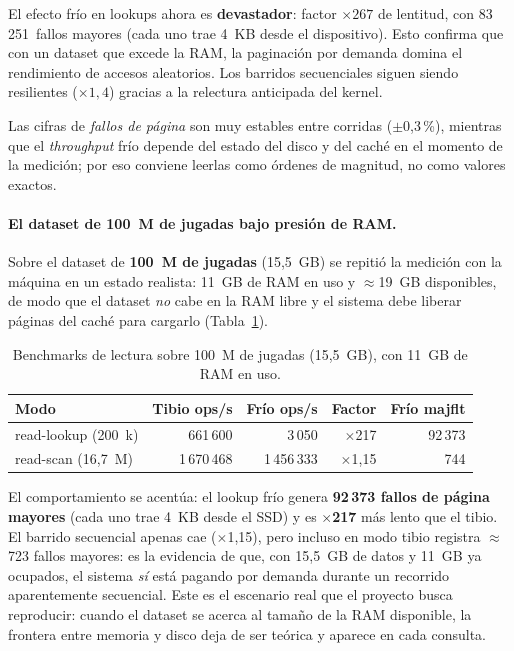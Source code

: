 \documentclass[12pt, letterpaper]{article}
\begin{document}
El efecto frío en lookups ahora es \textbf{devastador}: factor
$\times 267$ de lentitud, con 83\,251~fallos mayores (cada uno trae 4~KB
desde el dispositivo). Esto confirma que con un dataset que excede la RAM,
la paginación por demanda domina el rendimiento de accesos aleatorios. Los
barridos secuenciales siguen siendo resilientes ($\times 1{,}4$) gracias a
la relectura anticipada del kernel.

Las cifras de \emph{fallos de página} son muy estables entre corridas
($\pm$0{,}3\,\%), mientras que el \emph{throughput} frío depende del estado
del disco y del caché en el momento de la medición; por eso conviene leerlas
como órdenes de magnitud, no como valores exactos.

\paragraph{El dataset de 100~M de jugadas bajo presión de RAM.}
Sobre el dataset de \textbf{100~M de jugadas} (15{,}5~GB) se repitió la
medición con la máquina en un estado realista: 11~GB de RAM en uso y
$\approx$19~GB disponibles, de modo que el dataset \emph{no} cabe en la RAM
libre y el sistema debe liberar páginas del caché para cargarlo
(Tabla~\ref{tab:fase5_100m}).

\begin{table}[H]
\centering
\caption{Benchmarks de lectura sobre 100~M de jugadas (15{,}5~GB), con 11~GB de RAM en uso.}
\label{tab:fase5_100m}
\begin{tabular}{@{}l r r r r@{}}
\toprule
\textbf{Modo} & \textbf{Tibio ops/s} & \textbf{Frío ops/s} & \textbf{Factor} & \textbf{Frío majflt} \\
\midrule
read-lookup (200~k) & 661\,600 & 3\,050 & $\times$217 & 92\,373 \\
read-scan (16,7~M) & 1\,670\,468 & 1\,456\,333 & $\times$1{,}15 & 744 \\
\bottomrule
\end{tabular}
\end{table}

El comportamiento se acentúa: el lookup frío genera \textbf{92\,373 fallos de
página mayores} (cada uno trae 4~KB desde el SSD) y es \textbf{$\times$217} más
lento que el tibio. El barrido secuencial apenas cae ($\times$1{,}15), pero
incluso en modo tibio registra $\approx$723 fallos mayores: es la evidencia de
que, con 15{,}5~GB de datos y 11~GB ya ocupados, el sistema \emph{sí} está
pagando por demanda durante un recorrido aparentemente secuencial. Este es el
escenario real que el proyecto busca reproducir: cuando el dataset se acerca al
tamaño de la RAM disponible, la frontera entre memoria y disco deja de ser
teórica y aparece en cada consulta.
\end{document}
